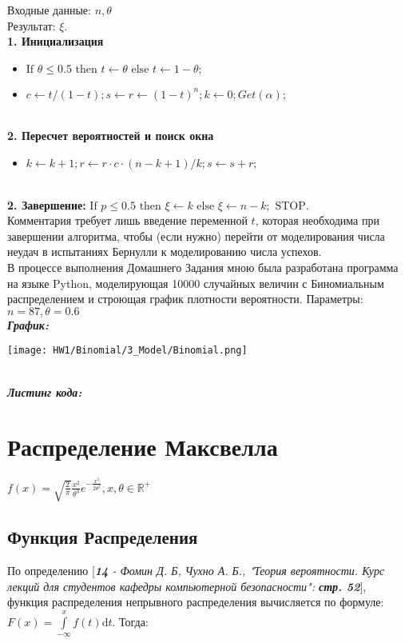 \documentclass[14pt,a4paper,oneside]{extbook}
\begin{document}
	Входные данные: $n, \theta$ \\
	Результат: $\xi$. \\
	\textbf{1. Инициализация}
	\begin{itemize}
	    \item $\textrm{If } \theta \leq 0.5 \textrm{ then } t \longleftarrow \theta \textrm{ else } t \longleftarrow 1 - \theta;$
	    \item $c \longleftarrow t/(1 - t); s \longleftarrow r \longleftarrow (1 - t)^{n}; k \longleftarrow 0; Get(\alpha);$
	\end{itemize}
	\\
	\textbf{2. Пересчет вероятностей и поиск окна}
	\begin{itemize}
	    \item $k \longleftarrow k + 1; r \longleftarrow r \cdot c \cdot (n - k + 1)/k; s \longleftarrow s + r;$
	\end{itemize}
	\\
	\textbf{2. Завершение: } $\textrm{If } p \leq 0.5 \textrm{ then } \xi \longleftarrow k \textrm{ else } \xi \longleftarrow n - k; \textrm{ STOP. }$
	\\
	Комментария требует лишь введение переменной $t$, которая необходима при завершении алгоритма, чтобы (если нужно) перейти от моделирования числа неудач в испытаниях Бернулли к
    моделированию числа успехов. \\
    В процессе выполнения Домашнего Задания мною была разработана программа на языке Python, моделирующая 10000 случайных величин с Биномиальным распределением и строющая график плотности вероятности. Параметры: $n = 87, \theta = 0.6$ \\
    \textbf{\textit{График:}}
    \begin{center}
         \texttt{[image: HW1/Binomial/3\_Model/Binomial.png]}
    \end{center}

    \\
    \textbf{\textit{Листинг кода:}}
    
	\newpage
	\section{Распределение Максвелла}
	$\displaystyle f(x) = \sqrt{\frac{2}{\pi}} \frac{x^{2}}{\theta^{3}} e^{-\frac{x^{2}}{2\theta^{2}}}, x, \theta \in \mathbb{R^{+}}$
	\subsection{Функция Распределения}
	По определению [\textit{\textbf{14} - Фомин Д. Б, Чухно А. Б., "Теория вероятности. Курс лекций для студентов кафедры компьютерной безопасности": \textbf{стр. 52}}], функция распределения непрывного распределения вычисляется по формуле: \\
	$\displaystyle F(x) = \int\limits_{-\infty}^{x}f(t)\mathrm{d}t$. Тогда:
\end{document}
